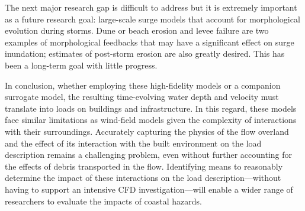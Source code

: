 The next major research gap is difficult to address but it is extremely important as a future research goal: large-scale surge models that account for morphological evolution during storms. Dune or beach erosion and levee failure are two examples of morphological feedbacks that may have a significant effect on surge inundation; estimates of post-storm erosion are also greatly desired. This has been a long-term goal with little progress.

In conclusion, whether employing these high-fidelity models or a companion surrogate model, the resulting time-evolving water depth and velocity must translate into loads on buildings and infrastructure. In this regard, these models face similar limitations as wind-field models given the complexity of interactions with their surroundings. Accurately capturing the physics of the flow overland and the effect of its interaction with the built environment on the load description remains a challenging problem, even without further accounting for the effects of debris transported in the flow. Identifying means to reasonably determine the impact of these interactions on the load description---without having to support an intensive CFD investigation---will enable a wider range of researchers to evaluate the impacts of coastal hazards. 


